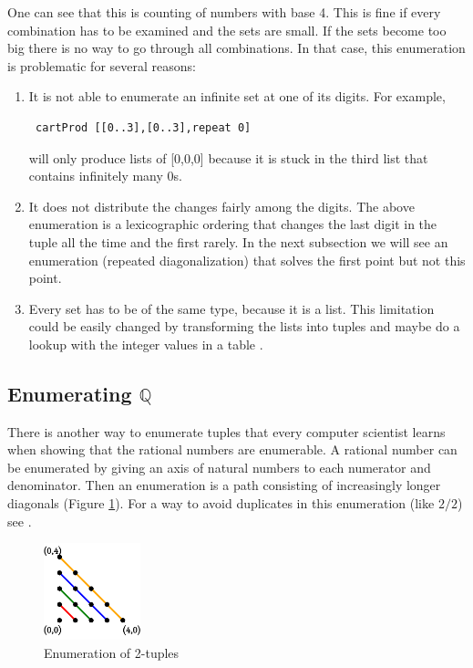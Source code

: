 \documentclass{tmr}
\newcommand{\authornote}[3]{{\color{#2} {\sc #1}: #3}}
\newcommand\bay[1]{\authornote{edward}{blue}{#1}}
\begin{document}
One can see that this is counting of numbers with base 4.
This is fine if every combination has to be examined and the sets are small. If the sets become too big there is no way to go through all combinations. %
In that case, this enumeration is problematic for several reasons:
\begin{enumerate}
\item It is not able to enumerate an infinite set at one of its digits. For example, \begin{verbatim} cartProd [[0..3],[0..3],repeat 0] \end{verbatim} will only produce lists of [0,0,0] because it is stuck in the third list that contains infinitely many 0s. %
\item It does not distribute the changes fairly among the digits. The above enumeration is a lexicographic ordering that changes the last digit in the tuple all the time and the first rarely. In the next subsection we will see an enumeration (repeated diagonalization) that solves the first point but not this point.
\item Every set has to be of the same type, because it is a list. This limitation could be easily changed by transforming the lists into tuples and maybe do a lookup with the integer values in a table . %
\end{enumerate}

\subsection{Enumerating $\mathbb{Q} $}
There is another way to enumerate tuples that every computer scientist learns when showing that the rational numbers are enumerable. A rational number can be enumerated by giving an axis of natural numbers to each numerator and denominator. Then an enumeration is a path consisting of increasingly longer diagonals (Figure \ref{enum2}). For a way to avoid duplicates in this enumeration (like $2/2$) see \cite{rationals}.

\begin{figure}[htbp]
  \centering
     \includegraphics[width=0.25\textwidth]{enum2c.pdf}
  \caption{Enumeration of 2-tuples}
  \label{enum2}
\end{figure}
\end{document}
